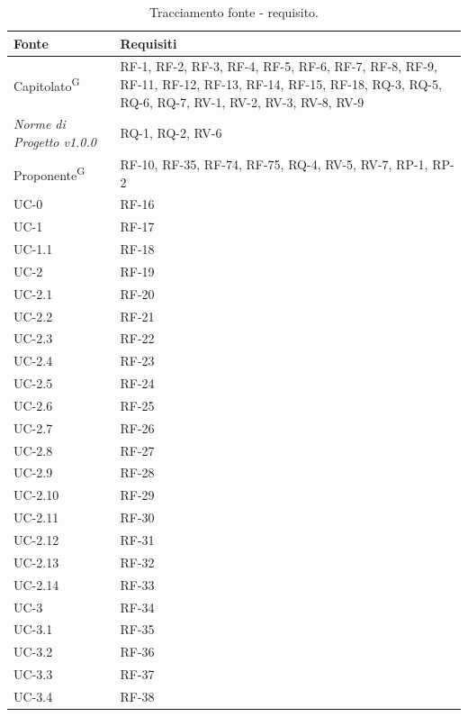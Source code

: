 \documentclass[8pt]{article}
\newcommand{\glossterm}[1]{#1\textsuperscript{G}} %
\begin{document}
\begin{longtable}{|>{\centering\arraybackslash}p{4cm}|>{\centering\arraybackslash}p{7cm}|}
		\hline
  \rowcolor{white}
		\textbf{Fonte} & \textbf{Requisiti} \\
		\hline
  \endfirsthead
\rowcolor{white}
  \caption{Tracciamento fonte - requisito.}
	\label{table:Tracciamento requisito - fonte}
 \endlastfoot
            \glossterm{Capitolato} & RF-1, RF-2, RF-3, RF-4, RF-5, RF-6, RF-7, RF-8, RF-9, RF-11, RF-12, RF-13, RF-14, RF-15, RF-18, RQ-3, RQ-5, RQ-6, RQ-7, RV-1, RV-2, RV-3, RV-8, RV-9 \\ \hline
        \textit{Norme di Progetto v1.0.0} & RQ-1, RQ-2, RV-6 \\ \hline
            \glossterm{Proponente} & RF-10, RF-35, RF-74, RF-75, RQ-4, RV-5, RV-7, RP-1, RP-2 \\ \hline
            UC-0 & RF-16 \\ \hline
            UC-1 & RF-17 \\ \hline
            UC-1.1 & RF-18 \\ \hline
            UC-2 & RF-19\\ \hline
            UC-2.1 & RF-20\\ \hline
            UC-2.2 & RF-21\\ \hline
            UC-2.3 & RF-22\\ \hline
            UC-2.4 & RF-23\\ \hline
            UC-2.5 & RF-24\\ \hline
            UC-2.6 & RF-25 \\ \hline
            UC-2.7 & RF-26\\ \hline
            UC-2.8 & RF-27\\ \hline
            UC-2.9 & RF-28\\ \hline
            UC-2.10 & RF-29\\ \hline
            UC-2.11 & RF-30\\ \hline
            UC-2.12 & RF-31\\ \hline
            UC-2.13 & RF-32\\ \hline
            UC-2.14 & RF-33\\ \hline
            UC-3 & RF-34\\ \hline
            UC-3.1 & RF-35\\ \hline
            UC-3.2 & RF-36\\ \hline
            UC-3.3 & RF-37\\ \hline
            UC-3.4 & RF-38\\ \hline

\end{longtable}
\end{document}
